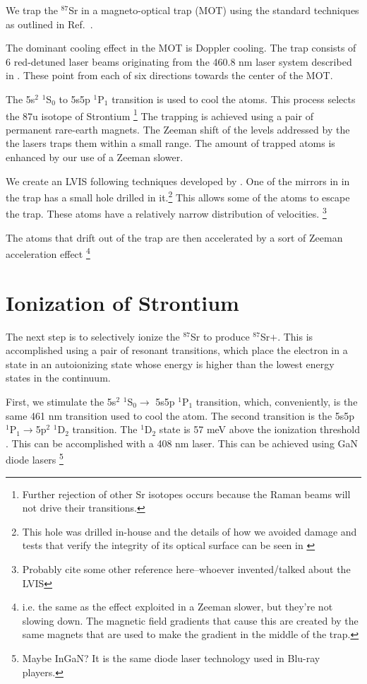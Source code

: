 We trap the $^{87}$Sr in a magneto-optical trap (MOT) using the standard techniques as outlined in Ref.\ \cite{cjeDiss}. 

The dominant cooling effect in the MOT is Doppler cooling. The trap consists of 6 red-detuned laser beams originating from the 460.8 nm laser system described in \cite{cjeDiss}. These point from each of six directions towards the center of the MOT. 

The 5s$^2$ $^1$S$_0$ to 5s5p $^1$P$_1$ transition is used to cool the atoms. This process selects the 87u isotope of Strontium \footnote{Further rejection of other Sr isotopes occurs because the Raman beams will not drive their transitions.}
The trapping is achieved using a pair of permanent rare-earth magnets. The Zeeman shift of the levels addressed by the the lasers traps them within a small range. The amount of trapped atoms is enhanced by our use of a Zeeman slower. 

We create an LVIS \cite{cjeDiss} following techniques developed by \cite{LVIS}. One of the mirrors in in the trap has a small hole drilled in it.\footnote{This hole was drilled in-house and the details of how we avoided damage and tests that verify the integrity of its optical surface can be seen in \cite{cjeDiss}} This allows some of the atoms to escape the trap. These atoms have a relatively narrow distribution of velocities. \footnote{Probably cite some other reference here--whoever invented/talked about the LVIS}

The atoms that drift out of the trap are then accelerated by a sort of Zeeman acceleration effect \footnote{i.e. the same as the effect exploited in a Zeeman slower, but they're not slowing down. The magnetic field gradients that cause this are created by the same magnets that are used to make the gradient in the middle of the trap.}

\section{Ionization of Strontium}
 
The next step is to selectively ionize the $^{87}$Sr to produce $^{87}$Sr$+$. This is accomplished using a pair of resonant transitions, which place the electron in a state in an autoionizing state whose energy is higher than the lowest energy states in the continuum. 

First, we stimulate the 5s$^2$ $^1$S$_0 \rightarrow$ 5s5p $^1$P$_1$ transition, which, conveniently, is the same 461 nm transition used to cool the atom. The second transition is the 5s5p $^1$P$_1\rightarrow$5p$^2$ $^1$D$_2$ transition. The $^1$D$_2$ state is 57 meV above the ionization threshold \cite{NSFprop}. This can be accomplished with a 408 nm laser. This can be achieved using GaN diode lasers \footnote{Maybe InGaN? It is the same diode laser technology used in Blu-ray players.}

